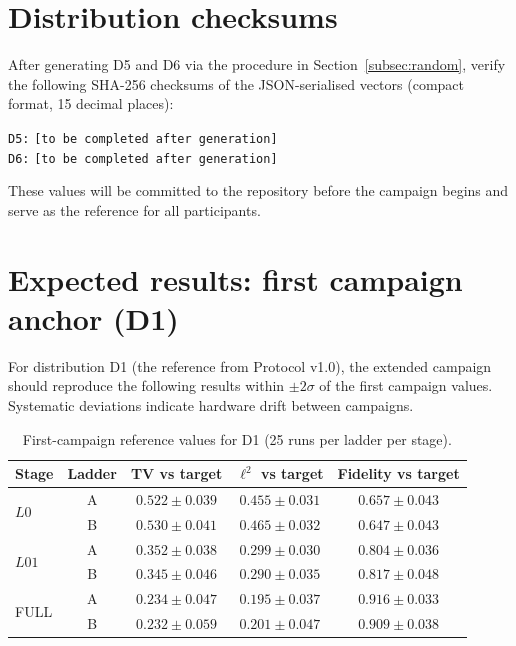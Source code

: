 \documentclass[11pt,a4paper]{article}
\begin{document}
\appendix

\section{Distribution checksums}
\label{sec:checksums}

After generating D5 and D6 via the procedure in
Section~\ref{subsec:random}, verify the following SHA-256 checksums
of the JSON-serialised vectors (compact format, 15 decimal places):

\medskip
\noindent\texttt{D5:} \texttt{[to be completed after generation]}\\
\texttt{D6:} \texttt{[to be completed after generation]}

\medskip
\noindent These values will be committed to the repository before
the campaign begins and serve as the reference for all participants.

\section{Expected results: first campaign anchor (D1)}
\label{sec:anchor}

For distribution D1 (the reference from Protocol v1.0), the
extended campaign should reproduce the following results within
$\pm 2\sigma$ of the first campaign values. Systematic deviations
indicate hardware drift between campaigns.

\begin{table}[H]
\centering
\caption{First-campaign reference values for D1 (25 runs per ladder per stage).}
\begin{tabular}{lcccc}
\toprule
Stage & Ladder & TV vs target & $\ell^2$ vs target & Fidelity vs target \\
\midrule
\multirow{2}{*}{$L0$}
  & A & $0.522\pm0.039$ & $0.455\pm0.031$ & $0.657\pm0.043$ \\
  & B & $0.530\pm0.041$ & $0.465\pm0.032$ & $0.647\pm0.043$ \\
\multirow{2}{*}{$L01$}
  & A & $0.352\pm0.038$ & $0.299\pm0.030$ & $0.804\pm0.036$ \\
  & B & $0.345\pm0.046$ & $0.290\pm0.035$ & $0.817\pm0.048$ \\
\multirow{2}{*}{FULL}
  & A & $0.234\pm0.047$ & $0.195\pm0.037$ & $0.916\pm0.033$ \\
  & B & $0.232\pm0.059$ & $0.201\pm0.047$ & $0.909\pm0.038$ \\
\bottomrule
\end{tabular}
\end{table}
\end{document}
